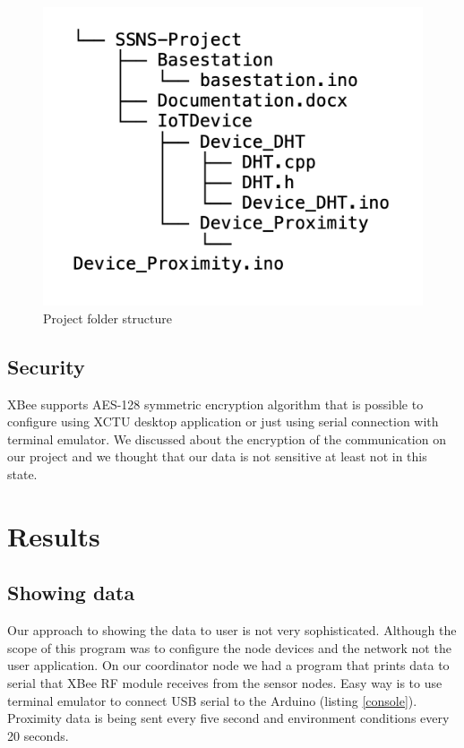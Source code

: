 \begin{figure}[!htbp]
    \centering
    \includegraphics[width=\textwidth]{folder.png}
    \caption{Project folder structure}
    \label{fig:folder}
\end{figure}
\FloatBarrier

\section{Security}
XBee supports AES-128 symmetric encryption algorithm \cite{yussoff2010development} that is possible to configure using XCTU desktop application or just using serial connection with terminal emulator.  We discussed about the encryption of the communication on our project and we thought that our data is not sensitive at least not in this state. 


\chapter{Results}
\section{Showing data}
Our approach to showing the data to user is not very sophisticated. Although the scope of this program was to configure the node devices and the network not the user application. On our coordinator node we had a program that prints data to serial that XBee RF module receives from the sensor nodes. Easy way is to use terminal emulator to connect USB serial to the Arduino (listing \ref{console}). Proximity data is being sent every five second and environment conditions every 20 seconds.

